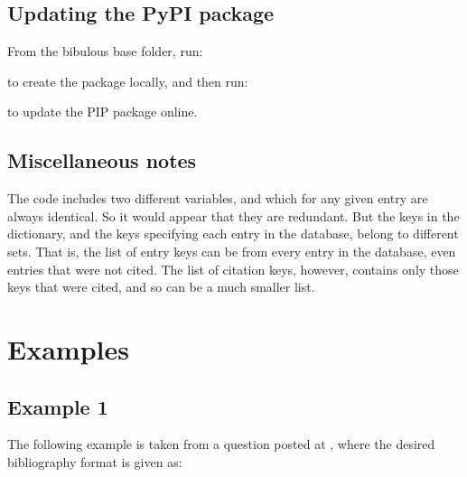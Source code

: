 \documentclass[letterpaper,10pt,english]{sphinxmanual}
\begin{document}
\section{Updating the PyPI package}
\label{\detokenize{developer_guide:updating-the-pypi-package}}
From the bibulous base folder, run:

%
\begin{sphinxVerbatim}[commandchars=\\\{\}]
   
\end{sphinxVerbatim}

to create the package locally, and then run:

%
\begin{sphinxVerbatim}[commandchars=\\\{\}]
   
\end{sphinxVerbatim}

to update the PIP package online.


\section{Miscellaneous notes}
\label{\detokenize{developer_guide:miscellaneous-notes}}
The code includes two different variables,  and  which for any given entry are always identical. So it would appear that they are redundant. But the keys in the  dictionary, and the keys specifying each entry in the database, belong to different sets. That is, the list of entry keys can be from every entry in the database, even entries that were not cited. The list of citation keys, however, contains only those keys that were cited, and so can be a much smaller list.


\chapter{Examples}
\label{\detokenize{examples:examples}}\label{\detokenize{examples::doc}}

\section{Example 1}
\label{\detokenize{examples:example-1}}
The following example is taken from a question posted at , where the desired bibliography format is given as:
\end{document}
